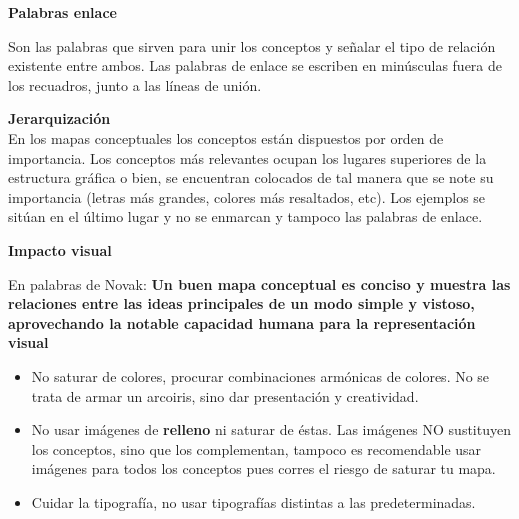 \documentclass[
	11pt, %
]{beamer}
\begin{document}
\begin{frame}
  \textbf{Palabras enlace}
  \bigskip %

  Son las palabras que sirven para unir los conceptos y señalar el tipo de relación existente entre ambos. Las palabras de enlace se escriben en minúsculas fuera de los recuadros, junto a las líneas de unión.

  \bigskip %
  \textbf{Jerarquización}\\
  \bigskip %
  En los mapas conceptuales los conceptos están dispuestos por orden de importancia. Los conceptos más relevantes ocupan los lugares superiores de la estructura gráfica o bien, se encuentran colocados de tal manera que se note su importancia (letras más grandes, colores más resaltados, etc). Los ejemplos se sitúan en el último lugar y no se enmarcan y tampoco las palabras de enlace.
  
\end{frame}

\begin{frame}
  \textbf{Impacto visual}
  \bigskip %

  En palabras de Novak: \textbf{Un buen mapa conceptual es conciso y muestra las relaciones entre las ideas principales de un modo simple y vistoso, aprovechando la notable capacidad humana para la representación visual}\\

  \begin{itemize}
  \item No saturar de colores, procurar combinaciones armónicas de colores. No se trata de armar un arcoiris, sino dar presentación y creatividad.
  \item No usar imágenes de \textbf{relleno} ni saturar de éstas. Las imágenes NO sustituyen los conceptos, sino que los complementan, tampoco es recomendable usar imágenes para todos los conceptos pues corres el riesgo de saturar tu mapa.
  \item Cuidar la tipografía, no usar tipografías distintas a las predeterminadas. 
  \end{itemize}
\end{frame}
\end{document}

